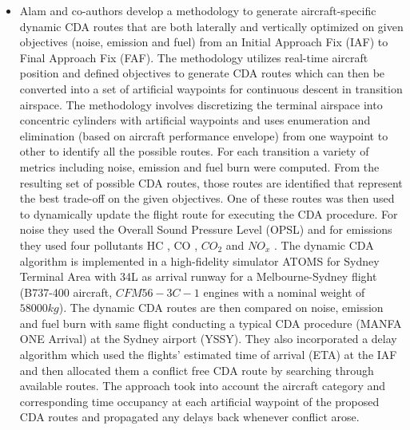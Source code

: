 \documentclass{aer1315-pretty}
\begin{document}
\begin{itemize}
\item Alam and co-authors \cite{Alam:2010} develop a methodology to generate aircraft-specific dynamic CDA routes that are both laterally and vertically optimized on given objectives (noise, emission and fuel) from an Initial Approach Fix (IAF) to Final Approach Fix (FAF). The
methodology utilizes real-time aircraft position and defined objectives to generate CDA routes which can then be converted into a set of artificial waypoints for continuous descent in transition airspace. The methodology involves discretizing the terminal airspace into concentric cylinders with artificial waypoints and uses enumeration and elimination (based on aircraft performance envelope) from one
waypoint to other to identify all the possible routes. For each transition a variety of metrics including noise, emission and fuel burn were computed. From the resulting set of possible CDA routes, those routes are identified that represent the best trade-off on the given
objectives. One of these routes was then used to dynamically update the flight route for executing the CDA procedure. For noise they used the Overall Sound Pressure Level (OPSL) and for emissions they used four pollutants HC , CO , $CO_2$ and $NO_x$ . The dynamic CDA algorithm is implemented in a high-fidelity simulator ATOMS for Sydney Terminal Area with 34L as arrival runway for a Melbourne-Sydney flight (B737-400 aircraft, $CFM56-3C-1$ engines with a nominal weight of $58000 kg$). The dynamic CDA routes are then compared on noise, emission and fuel burn with same flight conducting a typical CDA procedure (MANFA ONE Arrival) at the Sydney airport (YSSY). They also incorporated a delay algorithm which used the flights' estimated time of arrival (ETA) at the IAF and then allocated them a conflict free CDA route by searching through available routes. The approach took into account the aircraft category and corresponding time occupancy at each artificial waypoint of the proposed CDA routes and propagated any delays back whenever conflict arose.


\end{itemize}
\end{document}
